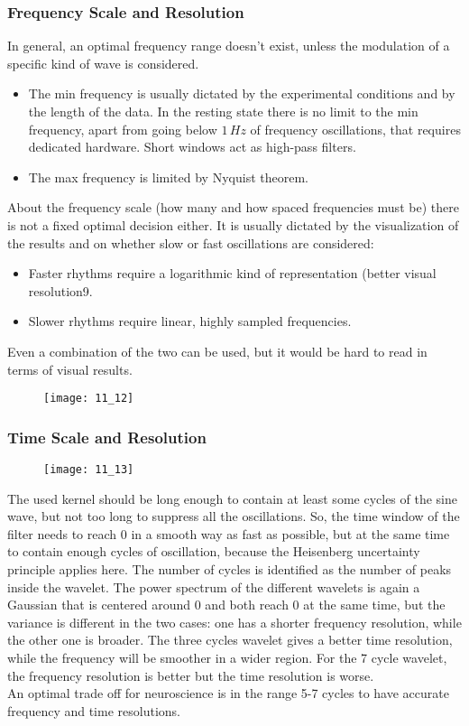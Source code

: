 \subsubsection{Frequency Scale and Resolution}
In general, an optimal frequency range doesn't exist, unless the modulation of a specific kind of wave is considered. 
\begin{itemize}
    \item The min frequency is usually dictated by the experimental conditions and by the length of the data. In the resting state there is no limit to the min frequency, apart from going below \(1\,Hz\) of frequency oscillations, that requires dedicated hardware. Short windows act as high-pass filters.
    \item The max frequency is limited by Nyquist theorem.  
\end{itemize}
About the frequency scale (how many and how spaced frequencies must be) there is not a fixed optimal decision either. It is usually dictated by the visualization of the results and on whether slow or fast oscillations are considered:
\begin{itemize}
    \item Faster rhythms require a logarithmic kind of representation (better visual resolution9.
    \item Slower rhythms require linear, highly sampled frequencies.
\end{itemize}
Even a combination of the two can be used, but it would be hard to read in terms of visual results.
\begin{figure}[H]
    \texttt{[image: 11\_12]}
    \centering
\end{figure}

\subsubsection{Time Scale and Resolution}
\begin{figure}[H]
    \texttt{[image: 11\_13]}
    \centering
\end{figure}
The used kernel should be long enough to contain at least some cycles of the sine wave, but not too long to suppress all the oscillations. So, the time window of the filter needs to reach 0 in a smooth way as fast as possible, but at the same time to contain enough cycles of oscillation, because the Heisenberg uncertainty principle applies here. The number of cycles is identified as the number of peaks inside the wavelet.
The power spectrum of the different wavelets is again a Gaussian that is centered around 0 and both reach 0 at the same time, but the variance is different in the two cases: one has a shorter frequency resolution, while the other one is broader. The three cycles wavelet gives a better time resolution, while the frequency will be smoother in a wider region. For the 7 cycle wavelet, the frequency resolution is better but the time resolution is worse.\\
An optimal trade off for neuroscience is in the range 5-7 cycles to have accurate frequency and time resolutions.